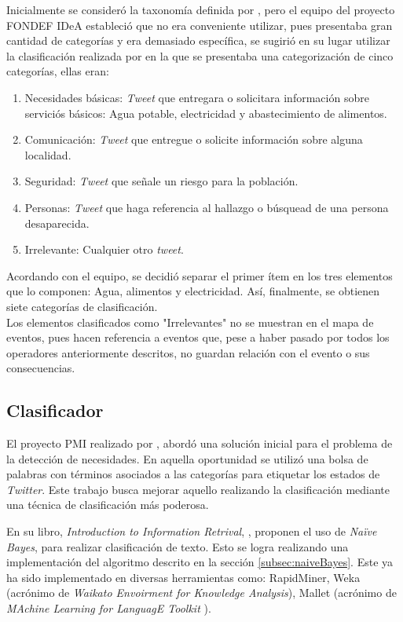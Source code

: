 Inicialmente se consideró la taxonomía definida por \cite{TaxonomiaChato}, pero el equipo del proyecto FONDEF IDeA estableció que no era conveniente utilizar, pues presentaba gran cantidad de categorías y era demasiado específica, se sugirió en su lugar utilizar la clasificación realizada por \cite{Alvarado} en la que se presentaba una categorización de cinco categorías, ellas eran:

\begin{enumerate}
\item Necesidades básicas: \textit{Tweet} que entregara o solicitara información sobre serviciós básicos: Agua potable, electricidad y abastecimiento de alimentos.
\item Comunicación: \textit{Tweet} que entregue o solicite información sobre alguna localidad.
\item Seguridad: \textit{Tweet} que señale un riesgo para la población.
\item Personas: \textit{Tweet} que haga referencia al hallazgo o búsquead de una persona desaparecida.
\item Irrelevante: Cualquier otro \textit{tweet}.
\end{enumerate}

Acordando con el equipo, se decidió separar el primer ítem en los tres elementos que lo componen: Agua, alimentos y electricidad. Así, finalmente, se obtienen siete categorías de clasificación.\\

Los elementos clasificados como "Irrelevantes" no se muestran en el mapa de eventos, pues hacen referencia a eventos que, pese a haber pasado por todos los operadores anteriormente descritos, no guardan relación con el evento o sus consecuencias.

\subsection{Clasificador}
\label{sec:diseno:clasificador}

El proyecto PMI realizado por \cite{WladdimiroPMI}, abordó una solución inicial para el problema de la detección de necesidades. En aquella oportunidad se utilizó una bolsa de palabras con términos asociados a las categorías para etiquetar los estados de \textit{Twitter}. Este trabajo busca mejorar aquello realizando la clasificación mediante una técnica de clasificación más poderosa.

En su libro, \textit{Introduction to Information Retrival}, \cite{IRQE}, proponen el uso de \textit{Naïve Bayes}, para realizar clasificación de texto. Esto se logra realizando una implementación del algoritmo descrito en la sección \ref{subsec:naiveBayes}. Este ya ha sido implementado en diversas herramientas como: RapidMiner, Weka (acrónimo de \textit{Waikato Envoirment for Knowledge Analysis}), Mallet (acrónimo de \textit{MAchine Learning for LanguagE Toolkit }).

